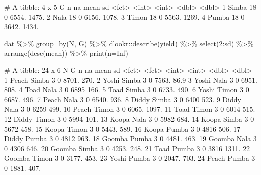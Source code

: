 \documentclass[
  letterpaper,
  DIV=11,
  numbers=noendperiod]{scrartcl}
\newenvironment{Shaded}{\begin{snugshade}}{\end{snugshade}}
\newcommand{\AttributeTok}[1]{\textcolor[rgb]{0.40,0.45,0.13}{#1}}
\newcommand{\ConstantTok}[1]{\textcolor[rgb]{0.56,0.35,0.01}{#1}}
\newcommand{\DecValTok}[1]{\textcolor[rgb]{0.68,0.00,0.00}{#1}}
\newcommand{\FunctionTok}[1]{\textcolor[rgb]{0.28,0.35,0.67}{#1}}
\newcommand{\NormalTok}[1]{\textcolor[rgb]{0.00,0.23,0.31}{#1}}
\newcommand{\SpecialCharTok}[1]{\textcolor[rgb]{0.37,0.37,0.37}{#1}}
\begin{document}
\begin{Shaded}
\begin{Highlighting}[]
\NormalTok{\# A tibble: 4 x 5}
\NormalTok{  G         n    na  mean    sd}
\NormalTok{  \textless{}fct\textgreater{} \textless{}int\textgreater{} \textless{}int\textgreater{} \textless{}dbl\textgreater{} \textless{}dbl\textgreater{}}
\NormalTok{1 Simba    18     0 6554. 1475.}
\NormalTok{2 Nala     18     0 6156. 1078.}
\NormalTok{3 Timon    18     0 5563. 1269.}
\NormalTok{4 Pumba    18     0 3642. 1434.}
\end{Highlighting}
\end{Shaded}

\begin{Shaded}
\begin{Highlighting}[]
\NormalTok{dat }\SpecialCharTok{\%\textgreater{}\%} 
  \FunctionTok{group\_by}\NormalTok{(N, G) }\SpecialCharTok{\%\textgreater{}\%} 
\NormalTok{  dlookr}\SpecialCharTok{::}\FunctionTok{describe}\NormalTok{(yield) }\SpecialCharTok{\%\textgreater{}\%} 
  \FunctionTok{select}\NormalTok{(}\DecValTok{2}\SpecialCharTok{:}\NormalTok{sd) }\SpecialCharTok{\%\textgreater{}\%}
  \FunctionTok{arrange}\NormalTok{(}\FunctionTok{desc}\NormalTok{(mean)) }\SpecialCharTok{\%\textgreater{}\%} 
  \FunctionTok{print}\NormalTok{(}\AttributeTok{n=}\ConstantTok{Inf}\NormalTok{)}
\end{Highlighting}
\end{Shaded}

\begin{Shaded}
\begin{Highlighting}[]
\NormalTok{\# A tibble: 24 x 6}
\NormalTok{   N      G         n    na  mean     sd}
\NormalTok{   \textless{}fct\textgreater{}  \textless{}fct\textgreater{} \textless{}int\textgreater{} \textless{}int\textgreater{} \textless{}dbl\textgreater{}  \textless{}dbl\textgreater{}}
\NormalTok{ 1 Peach  Simba     3     0 8701.  270. }
\NormalTok{ 2 Yoshi  Simba     3     0 7563.   86.9}
\NormalTok{ 3 Yoshi  Nala      3     0 6951.  808. }
\NormalTok{ 4 Toad   Nala      3     0 6895   166. }
\NormalTok{ 5 Toad   Simba     3     0 6733.  490. }
\NormalTok{ 6 Yoshi  Timon     3     0 6687.  496. }
\NormalTok{ 7 Peach  Nala      3     0 6540.  936. }
\NormalTok{ 8 Diddy  Simba     3     0 6400   523. }
\NormalTok{ 9 Diddy  Nala      3     0 6259   499. }
\NormalTok{10 Peach  Timon     3     0 6065. 1097. }
\NormalTok{11 Toad   Timon     3     0 6014   515. }
\NormalTok{12 Diddy  Timon     3     0 5994   101. }
\NormalTok{13 Koopa  Nala      3     0 5982   684. }
\NormalTok{14 Koopa  Simba     3     0 5672   458. }
\NormalTok{15 Koopa  Timon     3     0 5443.  589. }
\NormalTok{16 Koopa  Pumba     3     0 4816   506. }
\NormalTok{17 Diddy  Pumba     3     0 4812   963. }
\NormalTok{18 Goomba Pumba     3     0 4481.  463. }
\NormalTok{19 Goomba Nala      3     0 4306   646. }
\NormalTok{20 Goomba Simba     3     0 4253.  248. }
\NormalTok{21 Toad   Pumba     3     0 3816  1311. }
\NormalTok{22 Goomba Timon     3     0 3177.  453. }
\NormalTok{23 Yoshi  Pumba     3     0 2047.  703. }
\NormalTok{24 Peach  Pumba     3     0 1881.  407. }
\end{Highlighting}
\end{Shaded}
\end{document}
